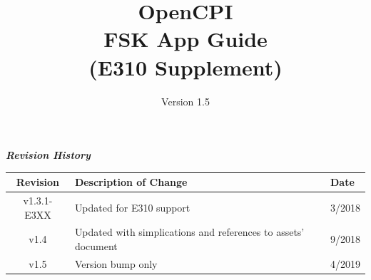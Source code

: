 \def\docTitle{OpenCPI\\ FSK App Guide\\ (E310 Supplement)}
\def\docVersion{1.5}
\def\snippetpath{../../../../../../doc/av/tex/snippets}


\date{Version \docVersion} %
\title{\docTitle}
\usepackage{graphicx}
\graphicspath{ {figures/} }
\usepackage{textcomp}


\maketitle
\newpage
	\begin{center}
	\textit{\textbf{Revision History}}
		\begin{table}[H]
		\label{table:revisions} %
			\begin{tabularx}{\textwidth}{|c|X|l|}
			\hline
			\rowcolor{blue}
			\textbf{Revision} & \textbf{Description of Change} & \textbf{Date} \\
			\hline
			v1.3.1-E3XX & Updated for E310 support & 3/2018 \\
			\hline
			v1.4 & Updated with simplications and references to assets' document & 9/2018 \\
			\hline
			v1.5 & Version bump only & 4/2019 \\
			\hline
			\end{tabularx}
		\end{table}
	\end{center}

